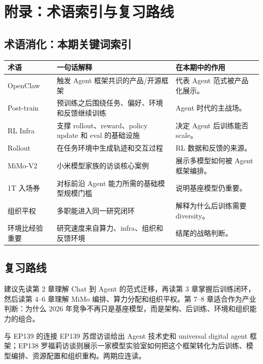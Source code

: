 \documentclass[a4paper]{article}
\begin{document}
\section{附录：术语索引与复习路线}

\subsection{术语消化：本期关键词索引}

\noindent\begin{longtable}{p{}p{}p{}}
\toprule
术语 & 一句话解释 & 在本期中的作用 \\
\midrule
OpenClaw & 触发 Agent 框架共识的产品/开源框架 & 代表 Agent 范式被产品化展示。 \\
Post-train & 预训练之后围绕任务、偏好、环境和反馈继续训练 & Agent 时代的主战场。 \\
RL Infra & 支撑 rollout、reward、policy update 和 eval 的基础设施 & 决定 Agent 后训练能否 scale。 \\
Rollout & 在任务环境中生成轨迹和交互过程 & RL 数据和反馈的来源。 \\
MiMo-V2 & 小米模型家族的访谈核心案例 & 展示多模型如何被 Agent 框架编排。 \\
1T 入场券 & 对标前沿 Agent 能力所需的基础模型规模门槛 & 说明基座模型仍重要。 \\
组织平权 & 多职能进入同一研究闭环 & 解释为什么后训练需要 diversity。 \\
环境比经验重要 & 研究速度来自算力、infra、组织和反馈环境 & 结尾的战略判断。 \\
\bottomrule
\end{longtable}

\subsection{复习路线}

建议先读第 2 章理解 Chat 到 Agent 的范式迁移，再读第 3 章掌握后训练闭环，然后读第 4--6 章理解 MiMo 编排、算力分配和组织平权。第 7--8 章适合作为产业判断：为什么 2026 年竞争不再只是基座模型，而是架构、后训练、环境和组织能力的组合。

\begin{knowledgebox}{与 EP139 的连接}
EP139 苏煜访谈给出 Agent 技术史和 universal digital agent 框架；EP138 罗福莉访谈则展示一家模型实验室如何把这个框架转化为后训练、模型编排、资源配置和组织重构。两期应连读。
\end{knowledgebox}
\end{document}
